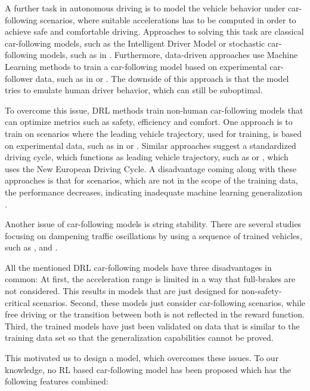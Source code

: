 \documentclass[review]{elsarticle}
\providecommand{\3}{{\ss}}
\begin{document}
A further task in autonomous driving is to model the vehicle behavior under car-following scenarios, where suitable accelerations has to be computed in order to achieve safe and comfortable driving. Approaches to solving this task are classical car-following models, such as the Intelligent Driver Model \cite{Opus} or stochastic car-following models, such as in \cite{Treiber2018stochIDM_TRB}. Furthermore, data-driven approaches use Machine Learning methods to train a car-following model based on experimental car-follower data, such as in \cite{Chong2011SimulationOD} or \cite{ZHOU2017245}. The downside of this approach is that the model tries to emulate human driver behavior, which can still be suboptimal.

To overcome this issue, DRL methods train non-human car-following models that can optimize metrics such as safety, efficiency and comfort. 
One approach is to train on scenarios where the leading vehicle trajectory, used for training, is based on experimental data, such as in \cite{SafeEfficientAndComfortable} or \cite{HumanLikeAutonomouCF}. Similar approaches suggest a standardized driving cycle, which functions as leading vehicle trajectory, such as \cite{ComparisonRLvsMPC} or \cite{CFelectricVehicle}, which uses the New European Driving Cycle.
A disadvantage coming along with these approaches is that for scenarios, which are not in the scope of the training data, the performance decreases, indicating inadequate machine learning generalization \cite{ComparisonRLvsMPC}. 

Another issue of car-following models is string stability. There are several studies focusing on dampening traffic oscillations by using a sequence of trained vehicles, such as \cite{qu2020jointly}, \cite{DissipatingStopAndGoWaves} and \cite{DampenStopAndGoTraffic}.

All the mentioned DRL car-following models have three disadvantages in common: At first, the acceleration range is limited in a way that full-brakes are not considered. This results in models that are just designed for non-safety-critical scenarios. Second, these models just consider car-following scenarios, while free driving or the transition between both is not reflected in the reward function. Third, the trained models have just been validated on data that is similar to the training data set so that the generalization capabilities cannot be proved. 

This motivated us to design a model, which overcomes these issues.
To our knowledge, no RL based car-following model has been proposed which has the following features combined:
\end{document}
